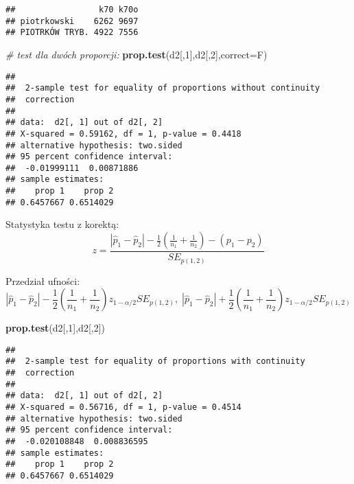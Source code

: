 \documentclass[polish,]{book}
\newenvironment{Shaded}{\begin{snugshade}}{\end{snugshade}}
\newcommand{\CommentTok}[1]{\textcolor[rgb]{0.56,0.35,0.01}{\textit{#1}}}
\newcommand{\DataTypeTok}[1]{\textcolor[rgb]{0.13,0.29,0.53}{#1}}
\newcommand{\DecValTok}[1]{\textcolor[rgb]{0.00,0.00,0.81}{#1}}
\newcommand{\KeywordTok}[1]{\textcolor[rgb]{0.13,0.29,0.53}{\textbf{#1}}}
\newcommand{\NormalTok}[1]{#1}
\begin{document}
\begin{verbatim}
##                 k70 k70o
## piotrkowski    6262 9697
## PIOTRKÓW TRYB. 4922 7556
\end{verbatim}

\begin{Shaded}
\begin{Highlighting}[]
\CommentTok{# test dla dwóch proporcji:}
\KeywordTok{prop.test}\NormalTok{(d2[,}\DecValTok{1}\NormalTok{],d2[,}\DecValTok{2}\NormalTok{],}\DataTypeTok{correct=}\NormalTok{F)}
\end{Highlighting}
\end{Shaded}

\begin{verbatim}
## 
##  2-sample test for equality of proportions without continuity
##  correction
## 
## data:  d2[, 1] out of d2[, 2]
## X-squared = 0.59162, df = 1, p-value = 0.4418
## alternative hypothesis: two.sided
## 95 percent confidence interval:
##  -0.01999111  0.00871886
## sample estimates:
##    prop 1    prop 2 
## 0.6457667 0.6514029
\end{verbatim}

Statystyka testu z korektą:
\begin{equation}
z=\frac{|\hat{p}_1-\hat{p}_2|-\frac{1}{2}\left(\frac{1}{n_1}+\frac{1}{n_2}\right)-(p_1-p_2)}{SE_{p(1,2)}}
\label{eq:wz1166}
\end{equation}

Przedział ufności:
\begin{equation}
|\hat{p}_1-\hat{p}_2|-\frac{1}{2}\left(\frac{1}{n_1}+\frac{1}{n_2}\right)z_{1-\alpha/2}SE_{p(1,2)},\;|\hat{p}_1-\hat{p}_2|+\frac{1}{2}\left(\frac{1}{n_1}+\frac{1}{n_2}\right)z_{1-\alpha/2}SE_{p(1,2)}
\label{eq:wz1167}
\end{equation}

\begin{Shaded}
\begin{Highlighting}[]
\KeywordTok{prop.test}\NormalTok{(d2[,}\DecValTok{1}\NormalTok{],d2[,}\DecValTok{2}\NormalTok{])}
\end{Highlighting}
\end{Shaded}

\begin{verbatim}
## 
##  2-sample test for equality of proportions with continuity
##  correction
## 
## data:  d2[, 1] out of d2[, 2]
## X-squared = 0.56716, df = 1, p-value = 0.4514
## alternative hypothesis: two.sided
## 95 percent confidence interval:
##  -0.020108848  0.008836595
## sample estimates:
##    prop 1    prop 2 
## 0.6457667 0.6514029
\end{verbatim}
\end{document}
